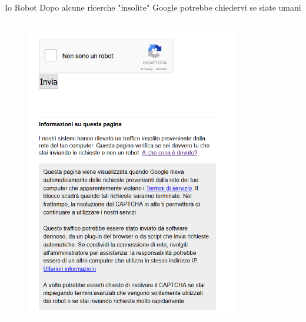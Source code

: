 \documentclass{beamer}
\begin{document}
\begin{frame}{Io Robot}
Dopo alcune ricerche "insolite" Google potrebbe chiedervi se siate umani
\begin{columns}
\begin{column}{0.6\linewidth}
\begin{figure}[h!]
\includegraphics[height=0.7\textheight]{immagini/captcha.png}
\end{figure}
\end{column}
\begin{column}{0.3\linewidth}
\begin{figure}[h!]

\end{figure}
\end{column}
\end{columns}
\end{frame}
\end{document}
